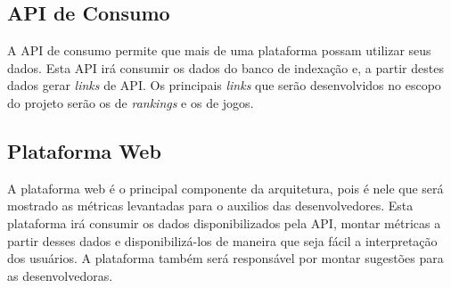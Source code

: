 \subsection{API de Consumo}
A API de consumo permite que mais de uma plataforma possam utilizar seus dados. Esta API irá consumir os dados do banco de indexação e, a partir destes dados gerar \textit{links} de API. Os principais \textit{links} que serão desenvolvidos no escopo do projeto serão os de \textit{rankings} e os de jogos.
\subsection{Plataforma Web}
A plataforma web é o principal componente da arquitetura, pois é nele que será mostrado as métricas levantadas para o auxilios das desenvolvedores. Esta plataforma irá consumir os dados disponibilizados pela API, montar métricas a partir desses dados e disponibilizá-los de maneira que seja fácil a interpretação dos usuários. A plataforma também será responsável por montar sugestões para as desenvolvedoras.

